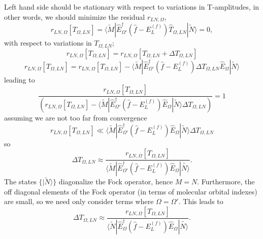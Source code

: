 \documentclass[12pt]{article}
\begin{document}
Left hand side should be stationary with respect to variations in T-amplitudes, in other words, we should minimize the residual $r_{LN,\Omega}$,
\begin{equation}
r_{LN,\Omega}[T_{\Omega,LN}]  =  \langle \tilde{M}  | \hat{E}^{\dagger}_{\Omega '} ( \hat{f} -E^{(f)}_{L} ) \hat{T}_{\Omega,LN} | \tilde{N} \rangle
=0 ,
\end{equation}
with respect to variations in $T_{\Omega, LN}$;
\begin{equation}
r_{LN,\Omega}[T_{\Omega,LN}] = r_{LN,\Omega}[T_{\Omega,LN}+\Delta T_{\Omega,LN}]  
\end{equation}
\begin{equation}
r_{LN,\Omega}[T_{\Omega,LN}] = r_{LN,\Omega}[T_{\Omega,LN}] - \langle \tilde{M}  | \hat{E}^{\dagger}_{\Omega '} ( \hat{f} -E^{(f)}_{L} ) \Delta T_{\Omega,LN} \hat{E}_{\Omega}  | \tilde{N} \rangle 
\end{equation}
leading to  
\begin{equation}
\frac{r_{LN,\Omega}[T_{\Omega,LN}]}{ (r_{LN,\Omega}[T_{\Omega,LN}] - \langle \tilde{M}  | \hat{E}^{\dagger}_{\Omega '} ( \hat{f} -E^{(f)}_{L} ) \hat{E}_{\Omega}  | \tilde{N} \rangle \Delta T_{\Omega,LN})} =1
\end{equation}
assuming we are not too far from convergence
\begin{equation}
r_{LN,\Omega} [T_{\Omega,LN}] \ll  \langle \tilde{M}  | \hat{E}^{\dagger}_{\Omega '} ( \hat{f} -E^{(f)}_{L} ) \hat{E}_{\Omega}  | \tilde{N} \rangle \Delta T_{\Omega,LN}
\end{equation}
so 
\begin{equation}
\Delta T_{\Omega, LN } \approx  \frac{r_{LN,\Omega}[T_{\Omega,LN}]}{ \langle \tilde{M}  | \hat{E}^{\dagger}_{\Omega '} ( \hat{f} -E^{(f)}_{L} ) \hat{E}_{\Omega}  | \tilde{N\rangle}}.
\end{equation}
The states $\{|\tilde{N}\rangle\}$ diagonalize the Fock operator, hence $M = N$. Furthermore, the off diagonal elements of the Fock operator
(in terms of molecular orbital indexes) are small, so we need only consider terms where $\Omega = \Omega '$. This leads to 
\begin{equation}
\Delta T_{\Omega, LN } \approx  \frac{r_{LN,\Omega}[T_{\Omega,LN}]}{ \langle \tilde{N}  | \hat{E}^{\dagger}_{\Omega} ( \hat{f} -E^{(f)}_{L} ) \hat{E}_{\Omega}  | \tilde{N\rangle}}.
\end{equation}
\end{document}
